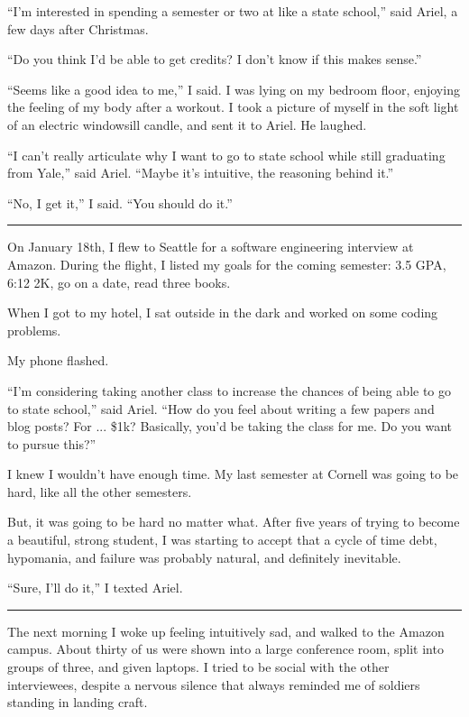 ``I'm interested in spending a semester or two at like a state school,'' said
Ariel, a few days after Christmas.  

``Do you think I'd be able to get credits?  I don't know if this makes sense.''

``Seems like a good idea to me,'' I said.  I was lying on my bedroom floor,
enjoying the feeling of my body after a workout.  I took a picture of myself in
the soft light of an electric windowsill candle, and sent it to Ariel.  He
laughed.

``I can't really articulate why I want to go to state school while still
graduating from Yale,'' said Ariel. ``Maybe it's intuitive, the reasoning
behind it.'' 

``No, I get it,'' I said. ``You should do it.''

\plainfancybreak{12pt}{2}{}

On January 18th, I flew to Seattle for a software engineering interview at
Amazon.  During the flight, I listed my goals for the coming semester: 3.5 GPA,
6:12 2K, go on a date, read three books.  

When I got to my hotel, I sat outside in the dark and worked on some coding
problems.

My phone flashed.

``I'm considering taking another class to increase the chances of being able to
go to state school,'' said Ariel.  ``How do you feel about writing a few papers
and blog posts?  For ... \$1k?  Basically, you'd be taking the class for me.  Do
you want to pursue this?'' 

I knew I wouldn't have enough time.  My last semester at Cornell was going to be
hard, like all the other semesters. 

But, it was going to be hard no matter what.  After five years of trying to
become a beautiful, strong student, I was starting to accept that a cycle of
time debt, hypomania, and failure was probably natural, and definitely
inevitable. 

``Sure, I'll do it,'' I texted Ariel.

\plainfancybreak{12pt}{2}{}

The next morning I woke up feeling intuitively sad, and walked to the Amazon
campus.  About thirty of us were shown into a large conference room, split into
groups of three, and given laptops.  I tried to be social with the other
interviewees, despite a nervous silence that always reminded me of soldiers
standing in landing craft.

